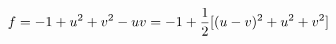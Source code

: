 \documentclass[preview]{standalone}
\begin{document}
\begin{align*}
\special{dvisvgm:raw <g id='unique000'>}f=-1+u^2+v^2-uv=-1+\frac12[(u-v)^2+u^2+v^2]\special{dvisvgm:raw </g>}
\end{align*}
\end{document}

